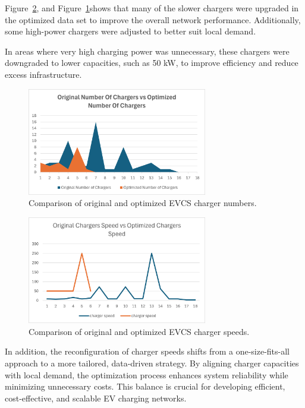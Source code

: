 Figure~\ref{fig:Original_Chargers_Speed_vs_Optimized_Chargers_Speed}, and Figure~\ref{fig:Original_Chargers_Number_vs_Optimized_Chargers_Number}shows that many of the slower chargers were upgraded in the optimized data set to improve the overall network performance. Additionally, some high-power chargers were adjusted to better suit local demand.

In areas where very high charging power was unnecessary, these chargers were downgraded to lower capacities, such as 50 kW, to improve efficiency and reduce excess infrastructure.

\begin{figure}[h!]
\centering
\includegraphics[width=0.7\textwidth]{../Figures/Original_vs_Optimized_evcs_chargers_number.png}
\caption{Comparison of original and optimized EVCS charger numbers.}
\label{fig:Original_Chargers_Number_vs_Optimized_Chargers_Number}
\end{figure}

\begin{figure}[h!]
\centering
\includegraphics[width=0.7\textwidth]{../Figures/Original_vs_Optimized_evcs_chargers_speed.png}
\caption{Comparison of original and optimized EVCS charger speeds.}
\label{fig:Original_Chargers_Speed_vs_Optimized_Chargers_Speed}
\end{figure}

In addition, the reconfiguration of charger speeds shifts from a one-size-fits-all approach to a more tailored, data-driven strategy. By aligning charger capacities with local demand, the optimization process enhances system reliability while minimizing unnecessary costs. This balance is crucial for developing efficient, cost-effective, and scalable EV charging networks.


